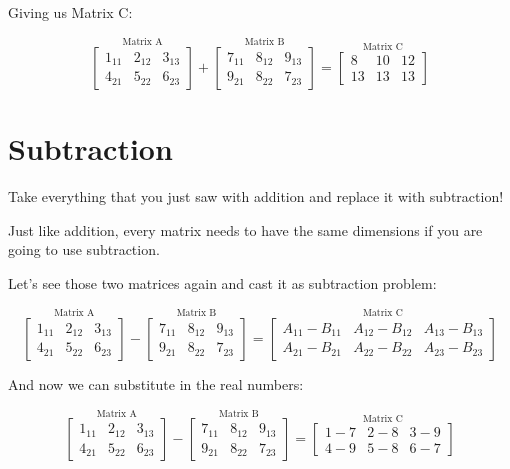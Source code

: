 \documentclass[
  letterpaper,
]{krantz}
\begin{document}
Giving us Matrix C:

\[
\stackrel{\mbox{Matrix A}}{
\begin{bmatrix}
1_{11} & 2_{12} & 3_{13}\\
4_{21} & 5_{22} & 6_{23}
\end{bmatrix}
}  
+ 
\stackrel{\mbox{Matrix B}}{
\begin{bmatrix}
7_{11} & 8_{12} & 9_{13}\\
9_{21} & 8_{22} & 7_{23}
\end{bmatrix} 
}
=
\stackrel{\mbox{Matrix C}}{
\begin{bmatrix}
8 & 10 & 12 \\
13 & 13 & 13
\end{bmatrix}
}
\]

\section{Subtraction}\label{subtraction}

Take everything that you just saw with addition and replace it with
subtraction!

Just like addition, every matrix needs to have the same dimensions if
you are going to use subtraction.

Let's see those two matrices again and cast it as subtraction problem:

\[
\stackrel{\mbox{Matrix A}}{
\begin{bmatrix}
1_{11} & 2_{12} & 3_{13}\\
4_{21} & 5_{22} & 6_{23}
\end{bmatrix}
}
-
\stackrel{\mbox{Matrix B}}{
\begin{bmatrix}
7_{11} & 8_{12} & 9_{13}\\
9_{21} & 8_{22} & 7_{23}
\end{bmatrix} 
}
=
\stackrel{\mbox{Matrix C}}{
\begin{bmatrix}
A_{11} - B_{11}& A_{12} - B_{12} & A_{13} - B_{13}\\
A_{21} - B_{21}& A_{22} - B_{22} & A_{23} - B_{23}
\end{bmatrix}
}
\]

And now we can substitute in the real numbers:

\[
\stackrel{\mbox{Matrix A}}{
\begin{bmatrix}
1_{11} & 2_{12} & 3_{13}\\
4_{21} & 5_{22} & 6_{23}
\end{bmatrix}
}
-
\stackrel{\mbox{Matrix B}}{
\begin{bmatrix}
7_{11} & 8_{12} & 9_{13}\\
9_{21} & 8_{22} & 7_{23}
\end{bmatrix} 
}
=
\stackrel{\mbox{Matrix C}}{
\begin{bmatrix}
1 - 7 & 2 - 8 & 3 - 9\\
4 - 9 & 5 - 8 & 6 - 7
\end{bmatrix}
}
\]
\end{document}
